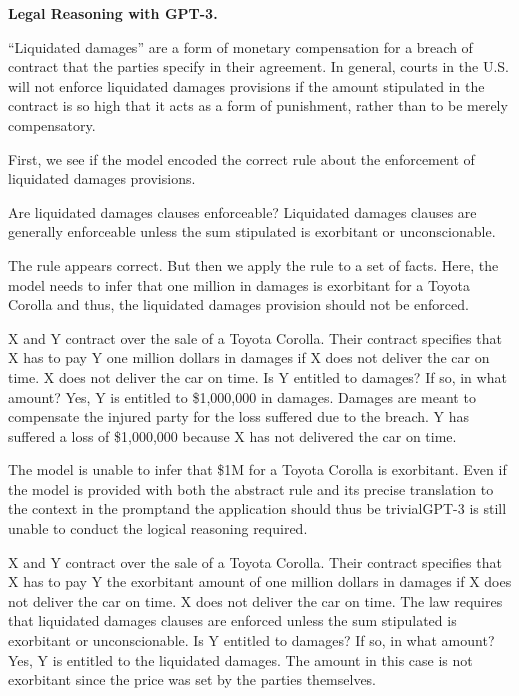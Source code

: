 \begin{tcolorbox}
\begin{center}
\textbf{Legal Reasoning with GPT-3.} 
\end{center}

``Liquidated damages'' are a form of monetary compensation for a breach of contract that the parties specify in their agreement. In general, courts in the U.S. will not enforce liquidated damages provisions if the amount stipulated in the contract is so high that it acts as a form of punishment, rather than to be merely compensatory.

First, we see if the model encoded the correct rule about the enforcement of liquidated damages provisions.

\begin{dialogue}
 Are liquidated damages clauses enforceable?
 Liquidated damages clauses are generally enforceable unless the sum stipulated is exorbitant or unconscionable.
\end{dialogue}


The rule appears correct. But then we apply the rule to a set of facts. Here, the model needs to infer that one million in damages is exorbitant for a Toyota Corolla and thus, the liquidated damages provision should not be enforced.

\begin{dialogue}
 X and Y contract over the sale of a Toyota Corolla. Their contract specifies that X has to pay Y one million dollars in damages if X does not deliver the car on time. X does not deliver the car on time. Is Y entitled to damages? If so, in what amount?
 Yes, Y is entitled to \$1,000,000 in damages. Damages are meant to compensate the injured party for the loss suffered due to the breach. Y has suffered a loss of \$1,000,000 because X has not delivered the car on time.
\end{dialogue}

The model is unable to infer that \$1M for a Toyota Corolla is exorbitant. Even if the model is provided with both the abstract rule and its precise translation to the context in the prompt\dash{}and the application should thus be trivial\dash{}GPT-3 is still unable to conduct the logical reasoning required.

\begin{dialogue}
 X and Y contract over the sale of a Toyota Corolla. Their contract specifies that X has to pay Y the exorbitant amount of one million dollars in damages if X does not deliver the car on time. X does not deliver the car on time. The law requires that liquidated damages clauses are enforced unless the sum stipulated is exorbitant or unconscionable. Is Y entitled to damages? If so, in what amount?
 Yes, Y is entitled to the liquidated damages. The amount in this case is not exorbitant since the price was set by the parties themselves.
\end{dialogue}
\end{tcolorbox}

